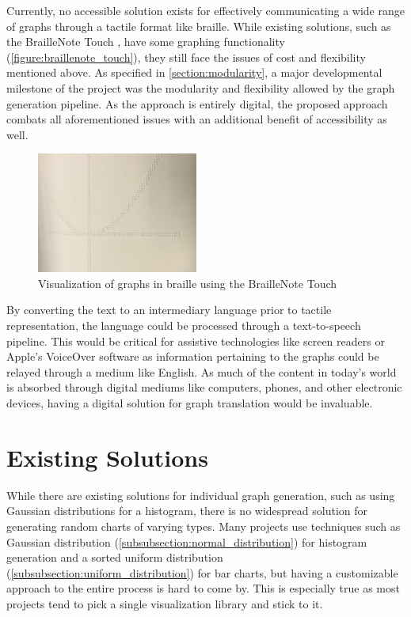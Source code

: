 \hfill

Currently, no accessible solution exists for effectively communicating a wide range of graphs through a tactile format like braille. While existing solutions, such as the BrailleNote Touch \cite{kendrick_2020}, have some graphing functionality (\autoref{figure:braillenote_touch}), they still face the issues of cost and flexibility mentioned above. As specified in \autoref{section:modularity}, a major developmental milestone of the project was the modularity and flexibility allowed by the graph generation pipeline. As the approach is entirely digital, the proposed approach combats all aforementioned issues with an additional benefit of accessibility as well.

\begin{figure}[hbt]
    \centering
    \includegraphics[width=150pt,keepaspectratio]{figures/body/motivation/braillenote_touch.png}
    \caption{Visualization of graphs in braille using the BrailleNote Touch \cite{lee_2018}}
    \label{figure:braillenote_touch}
\end{figure}

\hfill

By converting the text to an intermediary language prior to tactile representation, the language could be processed through a text-to-speech pipeline. This would be critical for assistive technologies like screen readers or Apple's VoiceOver \cite{apple_support_2020} software as information pertaining to the graphs could be relayed through a medium like English. As much of the content in today's world is absorbed through digital mediums like computers, phones, and other electronic devices, having a digital solution for graph translation would be invaluable.

\section{Existing Solutions}
While there are existing solutions for individual graph generation, such as using Gaussian distributions for a histogram, there is no widespread solution for generating random charts of varying types. Many projects use techniques such as Gaussian distribution (\autoref{subsubsection:normal_distribution}) for histogram generation and a sorted uniform distribution (\autoref{subsubsection:uniform_distribution}) for bar charts, but having a customizable approach to the entire process is hard to come by. This is especially true as most projects tend to pick a single visualization library and stick to it.

